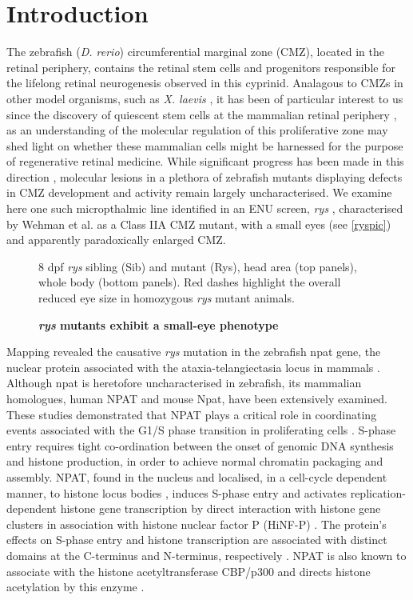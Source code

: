 \section{Introduction}
The zebrafish (\textit{D. rerio}) circumferential marginal zone (CMZ), located in the retinal periphery, contains the retinal stem cells and progenitors responsible for the lifelong retinal neurogenesis observed in this cyprinid. Analagous to CMZs in other model organisms, such as \textit{X. laevis} \cite{Perron1998}, it has been of particular interest to us since the discovery of quiescent stem cells at the mammalian retinal periphery \cite{Tropepe2000}, as an understanding of the molecular regulation of this proliferative zone may shed light on whether these mammalian cells might be harnessed for the purpose of regenerative retinal medicine. While significant progress has been made in this direction \cite{Raymond2006}, molecular lesions in a plethora of zebrafish mutants displaying defects in CMZ development and activity remain largely uncharacterised. We examine here one such micropthalmic line identified in an ENU screen, \textit{rys} \cite{Wehman2005}, characterised by Wehman et al. as a Class IIA CMZ mutant, with a small eyes (see \autoref{ryspic}) and apparently paradoxically enlarged CMZ.

\begin{figure}[!h]
    \caption{{\bf \textit{rys} mutants exhibit a small-eye phenotype}}
    \label{ryspic}
    8 dpf \textit{rys} sibling (Sib) and mutant (Rys), head area (top panels), whole body (bottom panels). Red dashes highlight the overall reduced eye size in homozygous \textit{rys} mutant animals.
\end{figure}

Mapping revealed the causative \textit{rys} mutation in the zebrafish npat gene, the nuclear protein associated with the ataxia-telangiectasia locus in mammals \cite{Imai1996}. Although npat is heretofore uncharacterised in zebrafish, its mammalian homologues, human NPAT and mouse Npat, have been extensively examined. These studies demonstrated that NPAT plays a critical role in coordinating events associated with the G1/S phase transition in proliferating cells \cite{Ye2003}. S-phase entry requires tight co-ordination between the onset of genomic DNA synthesis and histone production, in order to achieve normal chromatin packaging and assembly. NPAT, found in the nucleus \cite{Sagara2002} and localised, in a cell-cycle dependent manner, to histone locus bodies \cite{Ghule2009}, induces S-phase entry \cite{Zhao1998} and activates replication-dependent histone gene transcription by direct interaction with histone gene clusters \cite{Zhao2000} in association with histone nuclear factor P (HiNF-P) \cite{Mitra2003}. The protein’s effects on S-phase entry and histone transcription are associated with distinct domains at the C-terminus and N-terminus, respectively \cite{Wei2003}. NPAT is also known to associate with the histone acetyltransferase CBP/p300 \cite{Wang2004} and directs histone acetylation by this enzyme \cite{He2011}.

